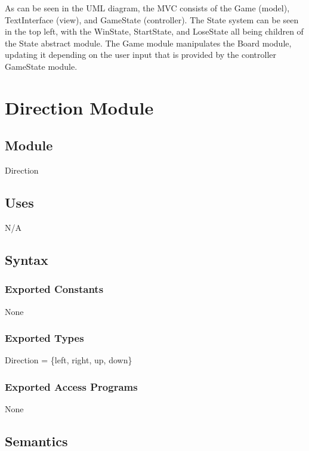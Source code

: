 \documentclass[12pt]{article}
\begin{document}
As can be seen in the UML diagram, the MVC consists of the Game (model), TextInterface (view), and GameState (controller). The State system can be seen in the top left, with the WinState, StartState, and LoseState all being children of the State abstract module. The Game module manipulates the Board module, updating it depending on the user input that is provided by the controller GameState module.

\medskip

\newpage

\section* {Direction Module}

\subsection*{Module}

Direction

\subsection* {Uses}

N/A

\subsection* {Syntax}

\subsubsection* {Exported Constants}

None

\subsubsection* {Exported Types}

Direction = \{left, right, up, down\}

\medskip

\subsubsection* {Exported Access Programs}

None

\subsection* {Semantics}
\end{document}
